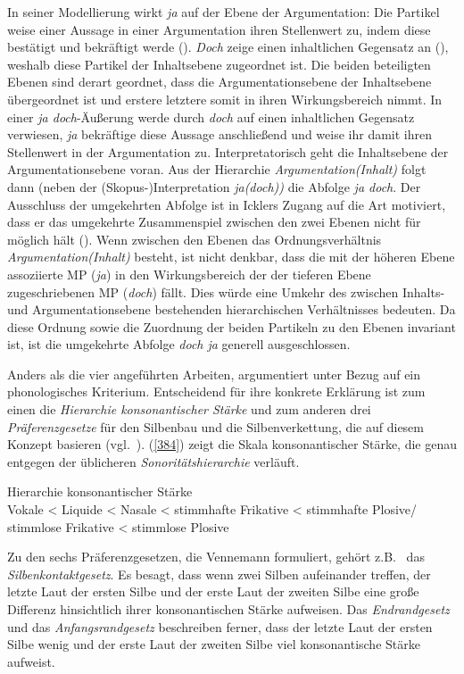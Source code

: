 In seiner Modellierung wirkt \textit{ja} auf der Ebene der Argumentation: Die Partikel weise einer Aussage in einer Argumentation ihren Stellenwert zu, indem diese bestätigt und bekräftigt werde (\citeyear[399]{Ickler1994}). \textit{Doch} zeige einen inhaltlichen Gegensatz an (\citeyear[401]{Ickler1994}), weshalb diese Partikel der Inhaltsebene zugeordnet ist. Die beiden beteiligten Ebenen sind derart geordnet, dass die Argumentationsebene  der Inhaltsebene  übergeordnet ist und erstere letztere somit in ihren Wirkungsbereich nimmt. In einer \textit{ja doch}-Äußerung werde durch \textit{doch} auf einen inhaltlichen Gegensatz verwiesen, \textit{ja} bekräftige diese Aussage anschließend und weise ihr damit ihren Stellenwert in der Argumentation zu. Interpretatorisch geht die Inhaltsebene der Argumentationsebene voran. Aus der Hierarchie \textit{Argumentation(Inhalt)} folgt dann (neben der (Skopus-)Interpretation \textit{ja(doch))} die Abfolge \textit{ja doch}. Der Ausschluss der umgekehrten Abfolge ist in Icklers Zugang auf die Art motiviert, dass er das umgekehrte Zusammenspiel zwischen den zwei Ebenen nicht für möglich hält (\citeyear[404]{Ickler1994}). Wenn zwischen den Ebenen das Ordnungsverhältnis \textit{Argumentation(Inhalt)} besteht, ist nicht denkbar, dass die mit der höheren Ebene assoziierte MP (\textit{ja}) in den Wirkungsbereich der der tieferen Ebene zugeschriebenen MP (\textit{doch}) fällt. Dies würde eine Umkehr des zwischen Inhalts- und Argumentationsebene bestehenden hierarchischen Verhältnisses bedeuten. Da diese Ordnung sowie die Zuordnung der beiden Partikeln zu den Ebenen invariant ist, ist die umgekehrte Abfolge \textit{doch ja} generell ausgeschlossen.

Anders als die vier angeführten Arbeiten, argumentiert \citet{Lindner1991} unter Bezug auf ein phonologisches Kriterium. Entscheidend für ihre konkrete Erklärung ist zum einen die \textit{Hierarchie konsonantischer Stärke} und zum anderen drei \textit{Präferenzgesetze} für den Silbenbau und die Silbenverkettung, die auf diesem Konzept basieren (vgl.\ \citealt[283/284]{Vennemann1982}). (\ref{384}) zeigt die Skala konsonantischer Stärke, die genau entgegen der üblicheren \textit{Sonoritätshierarchie} verläuft.

\begin{exe}
	\ex\label{384} 
	Hierarchie konsonantischer Stärke\\
	Vokale < Liquide < Nasale < stimmhafte Frikative < stimmhafte Plosive/\\stimmlose Frikative < stimmlose Plosive
\end{exe}
Zu den sechs Präferenzgesetzen, die Vennemann formuliert, gehört z.B.\  das \textit{Silbenkontaktgesetz}. Es besagt, dass wenn zwei Silben aufeinander treffen, der letzte Laut der ersten Silbe und der erste Laut der zweiten Silbe eine große Differenz hinsichtlich ihrer konsonantischen Stärke aufweisen. Das \textit{Endrandgesetz} und das \textit{Anfangsrandgesetz} beschreiben ferner, dass der letzte Laut der ersten Silbe wenig und der erste Laut der zweiten Silbe viel konsonantische Stärke aufweist.\largerpage

